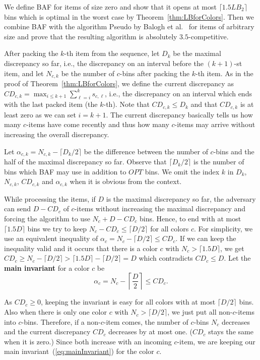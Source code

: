 \documentclass[11pt,a4paper]{article}
\def\vari#1{\mathit{#1}}
\begin{document}
We define BAF for items of size zero
and show that it opens at most $\lceil 1.5 \vari{LB_2}\rceil$ bins
which is optimal in the worst case by Theorem~\ref{thm:LBforColors}.
Then we combine BAF with the algorithm Pseudo by Balogh et al.~\cite{balogh14} for items of arbitrary size
and prove that the resulting algorithm is absolutely $3.5$-competitive.

After packing the $k$-th item from the sequence, let $D_k$ be the maximal discrepancy so far, i.e., the discrepancy on
an interval before the $(k+1)$-st item, and let $N_{c,k}$ be the number of $c$-bins after packing the $k$-th item.
As in the proof of Theorem~\ref{thm:LBforColors}, we define the current discrepancy as
$\vari{CD}_{c,k} = \max_{i \leq k+1} \sum_{\ell=i}^k s_{c,\ell}$,
i.e., the discrepancy on an interval which ends with the last packed item (the $k$-th).
Note that $\vari{CD}_{c,k} \leq D_k$ and that $\vari{CD}_{c,k}$ is at least zero as we can set $i = k+1$.
The current discrepancy basically tells us how many $c$-items
have come recently and thus how many $c$-items may arrive without increasing the overall discrepancy.

Let $\alpha_{c,k} = N_{c,k} - \lceil D_k/2\rceil $ be the difference
between the number of $c$-bins and the half of the maximal discrepancy so far.
Observe that $\lceil D_k/2\rceil $ is the number of bins which BAF may use in addition to $\vari{OPT}$ bins.
We omit the index $k$ in $D_k$, $N_{c,k}$, $\vari{CD}_{c,k}$ and $\alpha_{c,k}$
when it is obvious from the context.

While processing the items,
if $D$ is the maximal discrepancy so far,
the adversary can send $D - \vari{CD}_c$ of $c$-items
without increasing the maximal discrepancy and forcing the algorithm to use $N_c + D - \vari{CD}_c$ bins.
Hence, to end with at most $\lceil 1.5D\rceil$ bins we try to keep
$N_c - \vari{CD}_c \leq \lceil D/2\rceil$
for all colors $c$. For simplicity, we use an equivalent inequality of 
$\alpha_c = N_c - \lceil D/2\rceil \leq \vari{CD}_c$.
If we can keep the inequality valid and it occurs that there is a color $c$ with
$N_c > \lceil 1.5D\rceil$, we get
$\vari{CD}_c \geq N_c - \lceil D/2\rceil > \lceil 1.5D\rceil - \lceil D/2\rceil = D$
which contradicts $\vari{CD}_c \leq D$.
Let the \textbf{main invariant} for a color $c$ be
\begin{equation} \label{eq:mainInvariant}
\alpha_c = N_c - \left\lceil\frac{D}{2}\right\rceil \leq \vari{CD}_c.
\end{equation}

As $\vari{CD}_c \geq 0$, keeping the invariant is easy for all colors
with at most $\lceil D/2\rceil$ bins. Also when there is only one
color $c$ with $N_c > \lceil D/2\rceil$, we just put all non-$c$-items
into $c$-bins. Therefore, if a non-$c$-item comes, the number of $c$-bins $N_c$ decreases and the
current discrepancy $\vari{CD}_c$ decreases by at most one. ($\vari{CD}_c$ stays the same when it is zero.)
Since both increase with an incoming $c$-item, we are keeping our
main invariant~(\ref{eq:mainInvariant}) for the color $c$. 
\end{document}
